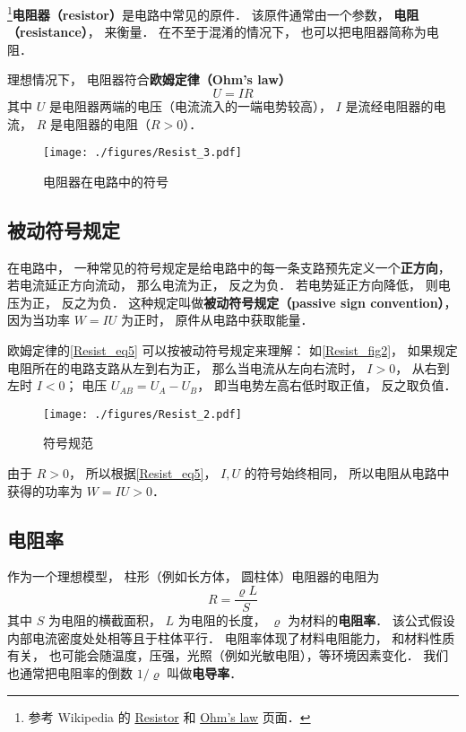 

\footnote{参考 Wikipedia 的 \href{https://en.wikipedia.org/wiki/Resistor}{Resistor} 和 \href{https://en.wikipedia.org/wiki/Ohm's_law}{Ohm's law} 页面．}\textbf{电阻器（resistor）}是电路中常见的原件． 该原件通常由一个参数， \textbf{电阻（resistance）}， 来衡量． 在不至于混淆的情况下， 也可以把电阻器简称为电阻．

理想情况下， 电阻器符合\textbf{欧姆定律（Ohm's law）}
\begin{equation}\label{Resist_eq5}
U = IR
\end{equation}
其中 $U$ 是电阻器两端的电压（电流流入的一端电势较高）， $I$ 是流经电阻器的电流， $R$ 是电阻器的电阻（$R > 0$）．

\begin{figure}[ht]
\centering
\texttt{[image: ./figures/Resist\_3.pdf]}
\caption{电阻器在电路中的符号} \label{Resist_fig3}
\end{figure}

\subsection{被动符号规定}\label{Resist_sub1}
在电路中， 一种常见的符号规定是给电路中的每一条支路预先定义一个\textbf{正方向}， 若电流延正方向流动， 那么电流为正， 反之为负． 若电势延正方向降低， 则电压为正， 反之为负． 这种规定叫做\textbf{被动符号规定（passive sign convention）}， 因为当功率 $W = IU$ 为正时， 原件从电路中获取能量．

欧姆定律的\autoref{Resist_eq5} 可以按被动符号规定来理解： 如\autoref{Resist_fig2}， 如果规定电阻所在的电路支路从左到右为正， 那么当电流从左向右流时， $I > 0$， 从右到左时 $I < 0$； 电压 $U_{AB} = U_A - U_B$， 即当电势左高右低时取正值， 反之取负值．

\begin{figure}[ht]
\centering
\texttt{[image: ./figures/Resist\_2.pdf]}
\caption{符号规范} \label{Resist_fig2}
\end{figure}

由于 $R > 0$， 所以根据\autoref{Resist_eq5}， $I, U$ 的符号始终相同， 所以电阻从电路中获得的功率为 $W = IU > 0$．

\subsection{电阻率}
作为一个理想模型， 柱形（例如长方体， 圆柱体）电阻器的电阻为
\begin{equation}
R = \frac{\varrho L}{S} 
\end{equation}
其中 $S$ 为电阻的横截面积， $L$ 为电阻的长度， $\varrho$ 为材料的\textbf{电阻率}． 该公式假设内部电流密度处处相等且于柱体平行． 电阻率体现了材料电阻能力， 和材料性质有关， 也可能会随温度，压强，光照（例如光敏电阻），等环境因素变化． 我们也通常把电阻率的倒数 $1/\varrho$ 叫做\textbf{电导率}．

